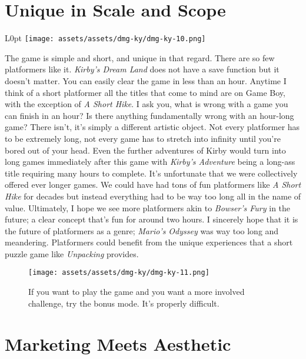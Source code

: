 \documentclass{book}
\begin{document}
\FloatBarrier\needspace{5pt}\section*{Unique in Scale and Scope}\nopagebreak[4]

\begin{wrapfigure}{L}{0pt} \texttt{[image: assets/assets/dmg-ky/dmg-ky-10.png]}\end{wrapfigure}
The game is simple and short, and unique in that regard. There are so few platformers like it. \emph{Kirby’s Dream Land} does not have a save function but it doesn’t matter. You can easily clear the game in less than an hour. Anytime I think of a short platformer all the titles that come to mind are on Game Boy, with the exception of \emph{A Short Hike}. I ask you, what is wrong with a game you can finish in an hour? Is there anything fundamentally wrong with an hour-long game? There isn’t, it’s simply a different artistic object. Not every platformer has to be extremely long, not every game has to stretch into infinity until you’re bored out of your head. Even the further adventures of Kirby would turn into long games immediately after this game with \emph{Kirby’s Adventure} being a long-ass title requiring many hours to complete. It’s unfortunate that we were collectively offered ever longer games. We could have had tons of fun platformers like \emph{A Short Hike} for decades but instead everything had to be way too long all in the name of value. Ultimately, I hope we see more platformers akin to \emph{Bowser’s Fury} in the future; a clear concept that’s fun for around two hours. I sincerely hope that it is the future of platformers as a genre; \emph{Mario’s Odyssey} was way too long and meandering. Platformers could benefit from the unique experiences that a short puzzle game like \emph{Unpacking} provides.

\begin{figure}[hbt]
\vskip 10pt
\centering \texttt{[image: assets/assets/dmg-ky/dmg-ky-11.png]}\par\pagetwodescription If you want to play the game and you want a more involved challenge, try the bonus mode. It’s properly difficult.
\vskip 6pt
\end{figure}

\FloatBarrier\needspace{5pt}\section*{Marketing Meets Aesthetic}\nopagebreak[4]
\end{document}

